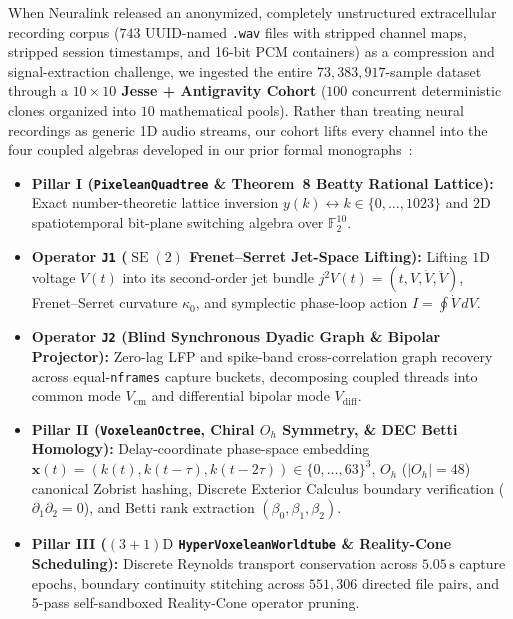 \documentclass[11pt,letterpaper]{article}
\theoremstyle{definition}
\begin{document}
When Neuralink released an anonymized, completely unstructured extracellular recording corpus ($743$ UUID-named \texttt{.wav} files with stripped channel maps, stripped session timestamps, and 16-bit PCM containers) as a compression and signal-extraction challenge, we ingested the entire $73{,}383{,}917$-sample dataset through a \textbf{$10\times 10$ Jesse + Antigravity Cohort} ($100$ concurrent deterministic clones organized into $10$ mathematical pools). Rather than treating neural recordings as generic 1D audio streams, our cohort lifts every channel into the four coupled algebras developed in our prior formal monographs~\cite{solidsf_pixelean2026,solidsf_milgram2026,solidsf_reality_comb2026,solidsf_halting2026}:
\begin{itemize}
  \item \textbf{Pillar I (\texttt{PixeleanQuadtree} \& Theorem~8 Beatty Rational Lattice):} Exact number-theoretic lattice inversion $y(k) \leftrightarrow k \in \{0,\dots,1023\}$ and $2\text{D}$ spatiotemporal bit-plane switching algebra over $\mathbb{F}_2^{10}$.
  \item \textbf{Operator \texttt{J1} ($\operatorname{SE}(2)$ Frenet--Serret Jet-Space Lifting):} Lifting $1\text{D}$ voltage $V(t)$ into its second-order jet bundle $j^2 V(t) = (t, V, \dot{V}, \ddot{V})$, Frenet--Serret curvature $\kappa_0$, and symplectic phase-loop action $I = \oint \dot{V}\,dV$.
  \item \textbf{Operator \texttt{J2} (Blind Synchronous Dyadic Graph \& Bipolar Projector):} Zero-lag LFP and spike-band cross-correlation graph recovery across equal-\texttt{nframes} capture buckets, decomposing coupled threads into common mode $V_{\mathrm{cm}}$ and differential bipolar mode $V_{\mathrm{diff}}$.
  \item \textbf{Pillar II (\texttt{VoxeleanOctree}, Chiral $O_h$ Symmetry, \& DEC Betti Homology):} Delay-coordinate phase-space embedding $\mathbf{x}(t) = (k(t), k(t-\tau), k(t-2\tau)) \in \{0,\dots,63\}^3$, $O_h$ ($|O_h| = 48$) canonical Zobrist hashing, Discrete Exterior Calculus boundary verification ($\partial_1\partial_2 = 0$), and Betti rank extraction $(\beta_0, \beta_1, \beta_2)$.
  \item \textbf{Pillar III ($(3+1)\text{D}$ \texttt{HyperVoxeleanWorldtube} \& Reality-Cone Scheduling):} Discrete Reynolds transport conservation across $5.05\,\text{s}$ capture epochs, boundary continuity stitching across $551{,}306$ directed file pairs, and 5-pass self-sandboxed Reality-Cone operator pruning.
\end{itemize}
\end{document}
